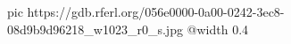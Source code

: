  
 
 
 
 

\ifcmt
  pic https://gdb.rferl.org/056e0000-0a00-0242-3ec8-08d9b9d96218_w1023_r0_s.jpg
  @width 0.4
\fi

\begin{center}
\end{center}
